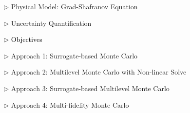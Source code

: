 \documentclass{beamer}
\begin{document}
\begin{frame}[c]
\large 	
\textcolor{mygray1}{
    \begin{itemize}[leftmargin=5pt] 
        \item[$\triangleright$]  Physical Model: Grad-Shafranov Equation
        \vspace{0.2cm}	
        \item[$\triangleright$] Uncertainty Quantification
        \vspace{0.2cm}
        \item[\textcolor{black}{$\triangleright$}] \textcolor{black}{\fontsize{25}{60}\selectfont Objectives}
        \vspace{0.2cm}
        \item[$\triangleright$] Approach 1: Surrogate-based Monte Carlo
        \vspace{0.2cm}
        \item[$\triangleright$] Approach 2: Multilevel Monte Carlo with Non-linear Solve
        \vspace{0.2cm}
        \item[$\triangleright$] Approach 3: Surrogate-based Multilevel Monte Carlo
        \vspace{0.2cm}
        \item[$\triangleright$] Approach 4: Multi-fidelity Monte Carlo
    \end{itemize}
}
\end{frame}
\end{document}
